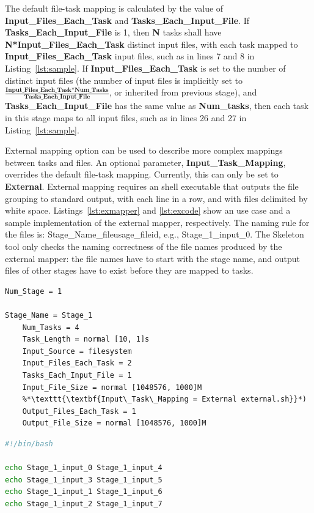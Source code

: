 \documentclass{sig-alternate}
\begin{document}
The default file-task mapping is calculated by the value of \textbf{Input\_Files\_Each\_Task} and \textbf{Tasks\_Each\_Input\_File}.
If \textbf{Tasks\_Each\_Input\_File} is 1, then \textbf{N} tasks shall have \textbf{N*Input\_Files\_Each\_Task} distinct input files, with
each task mapped to \textbf{Input\_Files\_Each\_Task} input files, such as in lines 7 and 8 in Listing~\ref{lst:sample}.
%
If \textbf{Input\_Files\_Each\_Task} is set to the number of distinct input files (the number of input files
is implicitly set to $\frac{\textbf{Input\_Files\_Each\_Task*Num\_Tasks}}{\textbf{Tasks\_Each\_Input\_File}}$, or inherited from previous stage),
and \textbf{Tasks\_Each\_Input\_File} has the same value as \textbf{Num\_tasks}, then each task in this stage maps to all input files, such as in lines 26 and 27 in Listing~\ref{lst:sample}.



External mapping option can be used to describe more complex mappings between tasks and files.
An optional parameter, \textbf{Input\_Task\_Mapping}, overrides the default file-task mapping.
Currently, this can only be set to \textbf{External}.
 External mapping requires an shell executable that outputs the file grouping to standard output, with each line in a row, and with files  delimited by white space.
Listings~\ref{lst:exmapper} and \ref{lst:excode} show an use case and a sample implementation of the external mapper, respectively.
The naming rule for the files is: Stage\_Name\_fileusage\_fileid, e.g., Stage\_1\_input\_0. The Skeleton tool only checks the naming correctness of the file names produced by the external mapper: the file names have to start with the stage name, and output files of other stages have to exist before they are mapped to tasks.

\begin{lstlisting}[caption=Use case of external mapper, label=lst:exmapper, linewidth=1.0\textwidth, xleftmargin=2.5ex]
Num_Stage = 1

Stage_Name = Stage_1
    Num_Tasks = 4  
    Task_Length = normal [10, 1]s
    Input_Source = filesystem
    Input_Files_Each_Task = 2
    Tasks_Each_Input_File = 1
    Input_File_Size = normal [1048576, 1000]M 
    %*\texttt{\textbf{Input\_Task\_Mapping = External external.sh}}*)
    Output_Files_Each_Task = 1
    Output_File_Size = normal [1048576, 1000]M
\end{lstlisting}

\begin{lstlisting}[language=Bash, caption=Sample code of external mapper, label=lst:excode, linewidth=1.0\textwidth, xleftmargin=2.5ex]
#!/bin/bash

echo Stage_1_input_0 Stage_1_input_4 
echo Stage_1_input_3 Stage_1_input_5
echo Stage_1_input_1 Stage_1_input_6
echo Stage_1_input_2 Stage_1_input_7
\end{lstlisting}
\end{document}
